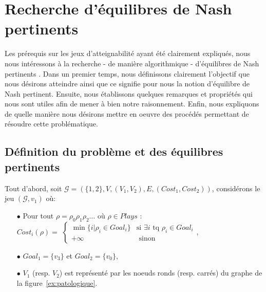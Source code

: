 
\section{Recherche d'équilibres de Nash pertinents}
\label{section:equilibrePert}

Les prérequis sur les jeux d'atteignabilité ayant été clairement expliqués, nous nous intéressons à la recherche - de manière algorithmique - d'équilibres de Nash \og pertinents \fg. Dans un premier temps, nous définissons clairement l'objectif que nous désirons atteindre ainsi que ce signifie pour nous la notion d'équilibre de Nash pertinent. Ensuite, nous établissons quelques remarques et propriétés qui nous sont utiles afin de mener à bien notre raisonnement. Enfin, nous expliquons de quelle manière nous désirons mettre en oeuvre des procédés permettant de résoudre cette problématique.

\subsection{Définition du problème et des équilibres pertinents}
\label{subsection:defEqPert}

Tout d'abord, soit $\mathcal{G} = ( \{ 1,2 \}, V, (V_{1}, V_{2}),E, (Cost _{1},Cost _{2}))$, considérons le jeu $(\mathcal{G},v_{1})$ où:\begin{enumerate}
\item[$\bullet$] Pour tout  $\rho = \rho _{0} \rho _{1} \rho _{2} \ldots $ où $\rho \in Plays$ :\\$Cost_{i}(\rho) = $ $\begin{cases} 
								\min \{ i | \rho _{i} \in Goal_{i} \} & \text{si } \exists i \text{ tq } \rho _{i} \in Goal_{i} \\
								+\infty & \text{ sinon}
								\end{cases}$,
\item[$\bullet$] $Goal_{1} = \{ v_{3} \}$ et $Goal_{2} = \{ v_{0} \}$,
\item[$\bullet$]  $V_{1}$ (resp. $V_{2}$) est représenté par les noeuds ronds (resp. carrés) du graphe de la figure~\ref{ex:patologique}.

\end{enumerate}




